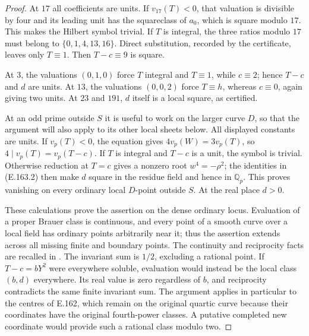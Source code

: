 \begin{proof}
At $17$ all coefficients are units.  If $v_{17}(T)<0$,
that valuation is divisible by four and its leading unit
has the squareclass of $a_0$, which is square modulo $17$.
This makes the Hilbert symbol trivial.  If $T$ is integral,
the three ratios modulo $17$ must belong to
$\{0,1,4,13,16\}$.  Direct substitution, recorded by the
certificate, leaves only $T\equiv1$.  Then $T-c\equiv9$
is square.

At $3$, the valuations $(0,1,0)$ force $T$ integral and
$T\equiv1$, while $c\equiv2$; hence $T-c$ and $d$ are units.
At $13$, the valuations $(0,0,2)$ force $T\equiv h$,
whereas $c\equiv0$, again giving two units.  At $23$ and
$191$, $d$ itself is a local square, as certified.

At an odd prime outside $S$ it is useful to work on the
larger curve $D$, so that the argument will also apply to
its other local sheets below.  All displayed constants
are units.  If $v_p(T)<0$, the equation gives
$4v_p(W)=3v_p(T)$, so $4\mid v_p(T)=v_p(T-c)$.
If $T$ is integral and $T-c$ is a unit, the symbol is
trivial.  Otherwise reduction at $T=c$ gives a nonzero
root $w^4=-\rho^2$; the identities in (E.163.2) then make
$d$ square in the residue field and hence in $\mathbb Q_p$.
This proves vanishing on every ordinary local $D$-point
outside $S$.  At the real place $d>0$.

These calculations prove the assertion on the dense ordinary
locus.  Evaluation of a proper Brauer class is continuous,
and every point of a smooth curve over a local field has
ordinary points arbitrarily near it; thus the assertion
extends across all missing finite and boundary points.
The continuity and reciprocity facts are recalled in
\citet[\S3.2 and Theorem 3.4, pp.~14--15]{LitColliotThelene2015AWS}.
The invariant sum is $1/2$, excluding a rational point.
If $T-c=bY^2$ were everywhere soluble, evaluation would
instead be the local class $(b,d)$ everywhere.  Its real
value is zero regardless of $b$, and reciprocity contradicts
the same finite invariant sum.  The argument applies in
particular to the centres of E.162, which remain on the
original quartic curve because their coordinates have the
original fourth-power classes.  A putative completed new
coordinate would provide such a rational class modulo two.
\end{proof}

